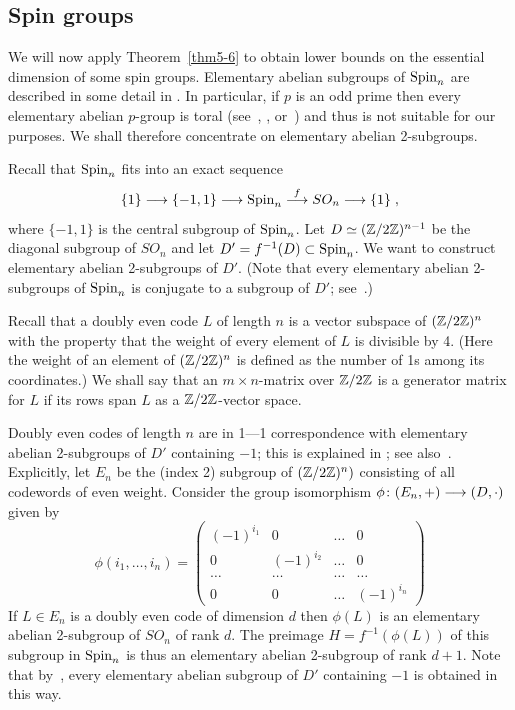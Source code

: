 \subsection*{Spin groups}
We will now apply Theorem~\ref{thm5-6} to obtain lower bounds
on the essential dimension of some spin groups. Elementary abelian subgroups
of $\operatorname{Spin}_n$ are described in some detail in \cite{wood}. In particular, 
if $p$ is an odd prime then every elementary abelian $p$-group is toral 
(see~\cite[Section 2.2]{serrepp}, \cite[Theorem 5.6]{wood}, 
or~\cite[(2.22)]{griess}) and thus is not suitable
for our purposes. We shall therefore concentrate on elementary
abelian 2-subgroups.

Recall that $\operatorname{Spin}_n$ fits into an exact sequence 
$$ \{1\} \longrightarrow \{ -1, 1 \} \longrightarrow \operatorname{Spin}_n \stackrel{f}{\longrightarrow} SO_n \longrightarrow \{1 \}
\; , $$ 
where $\{-1, 1\}$ is the central subgroup of $\operatorname{Spin}_n$.  Let 
$D \simeq ({\Bbb Z}/2{\Bbb Z})^{n-1}$ be the diagonal subgroup of $SO_n$
and let $D' = f^{-1}(D) \subset \operatorname{Spin}_n$. We want to construct elementary
abelian 2-subgroups of $D'$. (Note that every
elementary abelian 2-subgroups of $\operatorname{Spin}_n$ is conjugate to a subgroup of
$D'$; see~\cite[Theorem 5.6]{wood}.) 

Recall that a doubly even code $L$ of length $n$ is a vector subspace of
$({\Bbb Z}/2{\Bbb Z})^n$ with the property that the weight of every element of $L$ 
is divisible by 4.
(Here the weight of an element of  $({\Bbb Z}/2{\Bbb Z})^n$ is defined as the number 
of 1s among its coordinates.) We shall say that an $m \times n$-matrix
over ${\Bbb Z}/2{\Bbb Z}$ is a generator matrix for $L$ if its rows span $L$
as a ${\Bbb Z}/2{\Bbb Z}$-vector space.

Doubly even codes of length $n$ are in 1---1
correspondence with elementary abelian 2-subgroups of $D'$ containing $-1$;
this is explained in \cite[Sections 1 and 2]{wood}; see 
also~\cite[Section 7]{steinberg}.
Explicitly, let $E_n$ be the (index 2) subgroup of $({\Bbb Z}/2{\Bbb Z})^n)$ 
consisting of all codewords of even weight.  Consider 
the group isomorphism $\phi\colon (E_n, +) \longrightarrow (D, \cdot)$ given by 
\begin{equation} \label{e6.11}
\phi(i_1, \ldots, i_n) =
\left( \begin{matrix} (-1)^{i_1} & 0 & \hdots & 0 \\
                               0 & (-1)^{i_2} & \hdots & 0 \\
                               \hdots & \hdots & \hdots & \hdots \\
                               0 & 0 & \hdots & (-1)^{i_n} \end{matrix}
\right) \end{equation}
If $L \in E_n$ is a doubly even code of dimension $d$ then
$\phi(L)$ is an elementary abelian 2-subgroup of $SO_n$ of rank $d$. The 
preimage $H = f^{-1}(\phi(L))$ of this subgroup in $\operatorname{Spin}_n$
is thus an elementary abelian 2-subgroup of rank $d+1$. Note that
by~\cite[Theorem 2.1]{wood}, every elementary abelian
subgroup of $D'$ containing $-1$ is obtained in this way.

